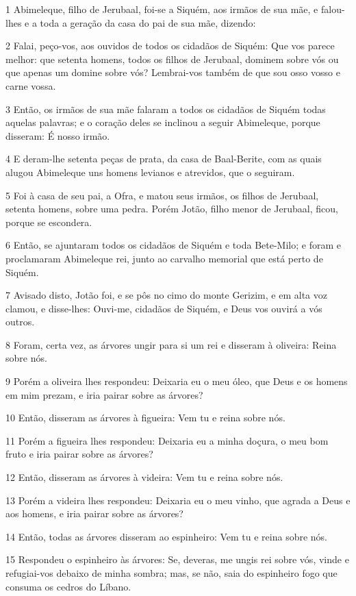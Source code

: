\par 1 Abimeleque, filho de Jerubaal, foi-se a Siquém, aos irmãos de sua mãe, e falou-lhes e a toda a geração da casa do pai de sua mãe, dizendo:
\par 2 Falai, peço-vos, aos ouvidos de todos os cidadãos de Siquém: Que vos parece melhor: que setenta homens, todos os filhos de Jerubaal, dominem sobre vós ou que apenas um domine sobre vós? Lembrai-vos também de que sou osso vosso e carne vossa.
\par 3 Então, os irmãos de sua mãe falaram a todos os cidadãos de Siquém todas aquelas palavras; e o coração deles se inclinou a seguir Abimeleque, porque disseram: É nosso irmão.
\par 4 E deram-lhe setenta peças de prata, da casa de Baal-Berite, com as quais alugou Abimeleque uns homens levianos e atrevidos, que o seguiram.
\par 5 Foi à casa de seu pai, a Ofra, e matou seus irmãos, os filhos de Jerubaal, setenta homens, sobre uma pedra. Porém Jotão, filho menor de Jerubaal, ficou, porque se escondera.
\par 6 Então, se ajuntaram todos os cidadãos de Siquém e toda Bete-Milo; e foram e proclamaram Abimeleque rei, junto ao carvalho memorial que está perto de Siquém.
\par 7 Avisado disto, Jotão foi, e se pôs no cimo do monte Gerizim, e em alta voz clamou, e disse-lhes: Ouvi-me, cidadãos de Siquém, e Deus vos ouvirá a vós outros.
\par 8 Foram, certa vez, as árvores ungir para si um rei e disseram à oliveira: Reina sobre nós.
\par 9 Porém a oliveira lhes respondeu: Deixaria eu o meu óleo, que Deus e os homens em mim prezam, e iria pairar sobre as árvores?
\par 10 Então, disseram as árvores à figueira: Vem tu e reina sobre nós.
\par 11 Porém a figueira lhes respondeu: Deixaria eu a minha doçura, o meu bom fruto e iria pairar sobre as árvores?
\par 12 Então, disseram as árvores à videira: Vem tu e reina sobre nós.
\par 13 Porém a videira lhes respondeu: Deixaria eu o meu vinho, que agrada a Deus e aos homens, e iria pairar sobre as árvores?
\par 14 Então, todas as árvores disseram ao espinheiro: Vem tu e reina sobre nós.
\par 15 Respondeu o espinheiro às árvores: Se, deveras, me ungis rei sobre vós, vinde e refugiai-vos debaixo de minha sombra; mas, se não, saia do espinheiro fogo que consuma os cedros do Líbano.
